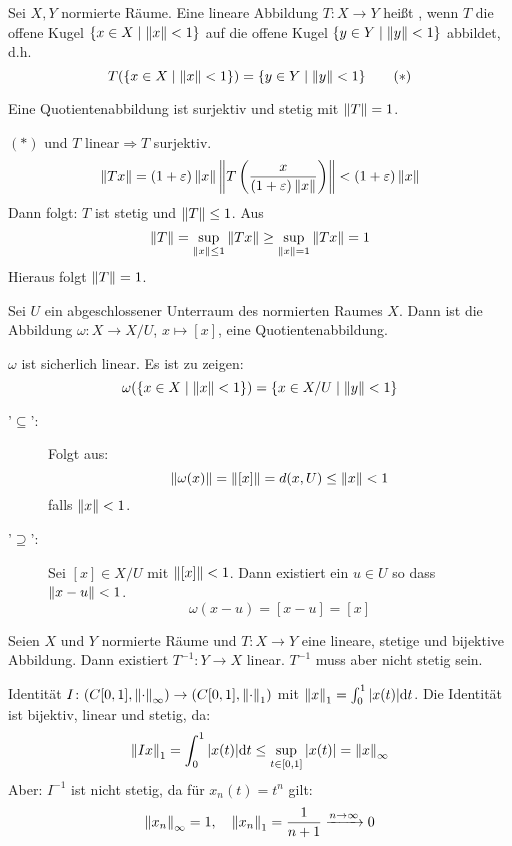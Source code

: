 \begin{definition}
	Sei $ X, Y $ normierte R\"aume. Eine lineare Abbildung $ T\colon X\rightarrow Y $ hei\ss t , wenn $ T $ die offene Kugel $ \lbrace x\in X\mid\left\|x\right\|<1\rbrace $ auf die offene Kugel $ \lbrace y\in Y\mid\left\|y\right\|<1\rbrace $ abbildet, d.h.
	\[ T(\lbrace x\in X\mid\left\|x\right\|<1\rbrace)=\lbrace y\in Y\mid\left\|y\right\|<1\rbrace\qquad(\ast) \]
\end{definition}
\begin{bemerkung*}
	Eine Quotientenabbildung ist surjektiv und stetig mit $ \left\|T\right\|=1 $.
	\begin{beweis}
		$ (\ast) $ und $ T $ linear$ \Rightarrow T $ surjektiv.
		\[ \left\|Tx\right\|=(1+\varepsilon)\left\|x\right\|\left\|T\left(\frac{x}{(1+\varepsilon)\left\|x\right\|}\right)\right\|<(1+\varepsilon)\left\|x\right\| \]
		Dann folgt: $ T $ ist stetig und $ \left\|T\right\|\leq 1 $. Aus
		\[ \left\|T\right\|=\sup_{\left\|x\right\|\leq 1}\left\|Tx\right\|\geq\sup_{\left\|x\right\|=1}\left\|Tx\right\|=1 \]
		Hieraus folgt $ \left\|T\right\|=1 $.
	\end{beweis}
\end{bemerkung*}
\begin{satz}
	Sei $ U $ ein abgeschlossener Unterraum des normierten Raumes $ X $. Dann ist die Abbildung $ \omega\colon X\rightarrow X/U $, $ x\mapsto [x] $, eine Quotientenabbildung. 
\end{satz}
\begin{beweis}
	$ \omega $ ist sicherlich linear. Es ist zu zeigen:
	\[ \omega(\lbrace x\in X\mid\left\|x\right\|<1\rbrace)=\lbrace x\in X/U\mid\left\|y\right\|<1\rbrace \]
	\begin{description}
		\item['$ \subseteq $':] Folgt aus:
		\[ \left\|\omega(x)\right\|=\left\|[x]\right\|=d(x,U)\leq\left\|x\right\|<1 \]
		falls $ \left\|x\right\|<1 $.
		\item['$ \supseteq $':] Sei $ [x]\in X/U $ mit $ \left\|[x]\right\|<1 $. Dann existiert ein $ u\in U $ so dass $ \left\|x-u\right\|<1 $.
		\[ \omega(x-u)=[x-u]=[x] \]
	\end{description}
\end{beweis}
\begin{bemerkung*}
	Seien $ X $ und $ Y $ normierte R\"aume und $ T\colon X\rightarrow Y $ eine lineare, stetige und bijektive Abbildung. Dann existiert $ T^{-1}\colon Y\rightarrow X $ linear. $ T^{-1} $ muss aber nicht stetig sein.
	\begin{beispiel*}
		Identit\"at $ I\colon (C[0,1],\left\|\cdot\right\|_\infty)\rightarrow (C[0,1],\left\|\cdot\right\|_1) $ mit $ \left\|x\right\|_1=\int_0^1 |x(t)|\mathrm d t $. Die Identit\"at ist bijektiv, linear und stetig, da:
		\[ \left\|Ix\right\|_1=\int_0^1 |x(t)|\mathrm d t\leq \sup_{t\in[0,1]}|x(t)|=\left\|x\right\|_\infty \]
		Aber: $ I^{-1} $ ist nicht stetig, da f\"ur $ x_n(t)=t^n $ gilt:
		\[ \left\|x_n\right\|_\infty=1,\quad \left\|x_n\right\|_1=\frac{1}{n+1}\xrightarrow{n\to\infty}0 \]
	\end{beispiel*}
\end{bemerkung*}
